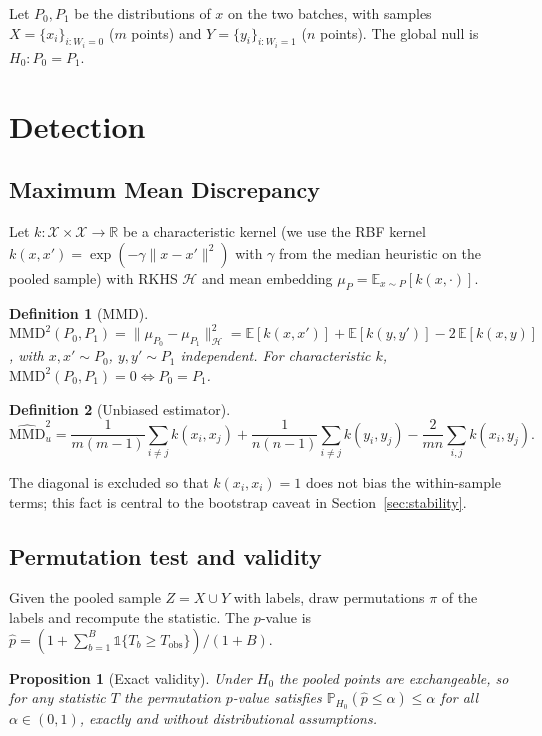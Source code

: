\documentclass[11pt]{article}
\newtheorem{definition}{Definition}
\newtheorem{proposition}{Proposition}
\newcommand{\R}{\mathbb{R}}
\newcommand{\E}{\mathbb{E}}
\newcommand{\PR}{\mathbb{P}}
\newcommand{\Xcal}{\mathcal{X}}
\newcommand{\Hcal}{\mathcal{H}}
\newcommand{\MMD}{\mathrm{MMD}}
\begin{document}
Let $P_0,P_1$ be the distributions of $x$ on the two batches, with samples
$X=\{x_i\}_{i:W_i=0}$ ($m$ points) and $Y=\{y_i\}_{i:W_i=1}$ ($n$ points). The
global null is $H_0:P_0=P_1$.

\section{Detection}

\subsection{Maximum Mean Discrepancy}

Let $k:\Xcal\times\Xcal\to\R$ be a characteristic kernel (we use the RBF kernel
$k(x,x')=\exp(-\gamma\|x-x'\|^2)$ with $\gamma$ from the median heuristic on the
pooled sample) with RKHS $\Hcal$ and mean embedding $\mu_P=\E_{x\sim P}[k(x,\cdot)]$.

\begin{definition}[MMD]
$\MMD^2(P_0,P_1)=\|\mu_{P_0}-\mu_{P_1}\|_\Hcal^2
=\E[k(x,x')]+\E[k(y,y')]-2\,\E[k(x,y)]$, with $x,x'\sim P_0$, $y,y'\sim P_1$
independent. For characteristic $k$, $\MMD^2(P_0,P_1)=0 \iff P_0=P_1$.
\end{definition}

\begin{definition}[Unbiased estimator]
\begin{equation}
\widehat{\MMD}^2_u
= \frac{1}{m(m-1)}\!\sum_{i\neq j}\! k(x_i,x_j)
+ \frac{1}{n(n-1)}\!\sum_{i\neq j}\! k(y_i,y_j)
- \frac{2}{mn}\!\sum_{i,j}\! k(x_i,y_j).
\label{eq:mmdu}
\end{equation}
\end{definition}
The diagonal is excluded so that $k(x_i,x_i)=1$ does not bias the within-sample
terms; this fact is central to the bootstrap caveat in
Section~\ref{sec:stability}.

\subsection{Permutation test and validity}

Given the pooled sample $Z=X\cup Y$ with labels, draw permutations
$\pi$ of the labels and recompute the statistic. The $p$-value is
$\hat p=(1+\sum_{b=1}^{B}\mathbb{1}\{T_b\ge T_{\mathrm{obs}}\})/(1+B)$.

\begin{proposition}[Exact validity]
Under $H_0$ the pooled points are exchangeable, so for any statistic $T$ the
permutation $p$-value satisfies $\PR_{H_0}(\hat p\le\alpha)\le\alpha$ for all
$\alpha\in(0,1)$, exactly and without distributional assumptions.
\end{proposition}
\end{document}
